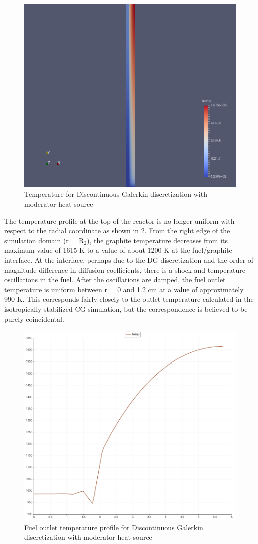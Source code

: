 \documentclass{article}
\begin{document}
\begin{figure}[htpb]
  \centering
  \includegraphics[width=.5\textwidth]{dg_mod_source_temperature_full_domain.png}
  \caption{Temperature for Discontinuous Galerkin discretization with moderator
    heat source}
  \label{fig:dg_mod_source_temperature}
\end{figure}

The temperature profile at the top of the reactor is no longer uniform with
respect to the radial coordinate as shown in
\cref{fig:dg_mod_source_temperature_outlet}. From the right edge of the
simulation domain (r = R$_2$), the graphite temperature decreases from its
maximum value of 1615 K to a value of about 1200 K at the fuel/graphite
interface. At the interface, perhaps due to the \gls{DG} discretization and the
order of magnitude difference in diffusion coefficients, there is a shock and
temperature oscillations in the fuel. After the oscillations are damped, the
fuel outlet temperature is uniform between r = 0 and 1.2 cm at a value of
approximately 990 K. This corresponds fairly closely to the outlet temperature
calculated in the isotropically stabilized \gls{CG} simulation, but the
correspondence is believed to be purely coincidental.

\begin{figure}[htpb]
  \centering
  \includegraphics[width=.5\textwidth]{dg_mod_source_temperature_outlet.png}
  \caption{Fuel outlet temperature profile for Discontinuous Galerkin
    discretization with moderator heat source}
  \label{fig:dg_mod_source_temperature_outlet}
\end{figure}
\end{document}
